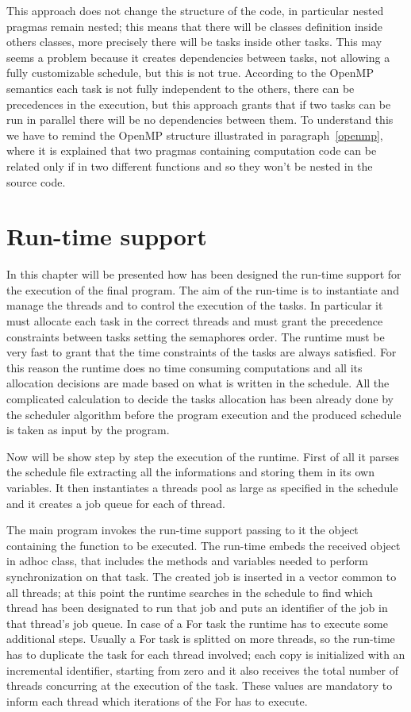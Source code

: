 \documentclass[a4paper,11pt,oneside]{book}
\begin{document}
This approach does not change the structure of the code, in particular nested pragmas remain nested; this means that there will be classes definition inside others classes, more precisely there will be tasks inside other tasks. This may seems a problem because it creates dependencies between tasks, not allowing a fully customizable schedule, but this is not true. According to the OpenMP semantics each task is not fully independent to the others, there can be precedences in the execution, but this approach grants that if two tasks can be run in parallel there will be no dependencies between them. To understand this we have to remind the OpenMP structure illustrated in paragraph~\ref{openmp}, where it is explained that two pragmas containing computation code  can be related only if in two different functions and so they won't be nested in the source code. 


\section{Run-time support}

In this chapter will be presented how has been designed the run-time support for the execution of the final program. The aim of the run-time is to instantiate and manage the threads and to control the execution of the tasks. In particular it must allocate each task in the correct threads and must grant the precedence constraints between tasks setting the semaphores order. The run\-time must be very fast to grant that the time constraints of the tasks are always satisfied. For this reason the run\-time does no time consuming computations and all its allocation decisions are made based on what is written in the schedule. All the complicated calculation to decide the tasks allocation has been already done by the scheduler algorithm before the program execution and the produced schedule is taken as input by the program. 

Now will be show step by step the execution of the run\-time. First of all it parses the schedule file extracting all the informations and storing them in its own variables. It then instantiates a threads pool as large as specified in the schedule and it creates a job queue for each of thread. 

The main program invokes the run-time support passing to it the object containing the function to be executed. The run-time embeds the received object in ad\-hoc class, that includes the methods and variables needed to perform synchronization on that task. The created job is inserted in a vector common to all threads; at this point the run\-time searches in the schedule to find which thread has been designated to run that job and puts an identifier of the job in that thread’s job queue. In case of a For task the run\-time has to execute some additional steps. Usually a For task is splitted on more threads, so the run-time has to duplicate the task for each thread involved; each copy is initialized with an incremental identifier, starting from zero and it also receives the total number of threads concurring at the execution of the task. These values are mandatory to inform each thread which iterations of the For has to execute. 
\end{document}
